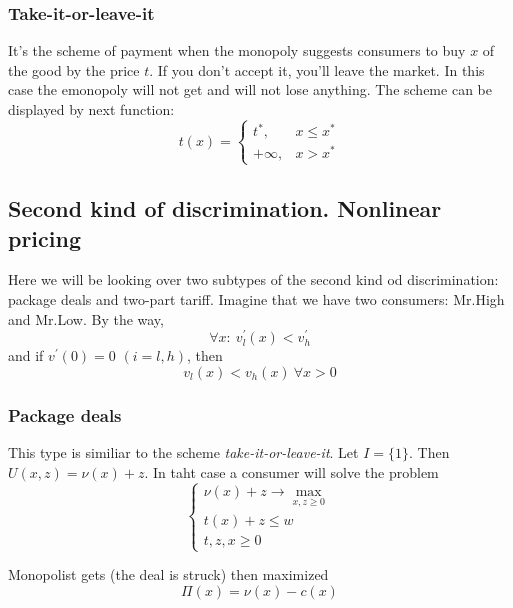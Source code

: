 \documentclass[a4paper, 10pt]{article}
\begin{document}
\subsubsection{Take-it-or-leave-it}
It's the scheme of payment when the monopoly suggests consumers to buy $x$ of the good by the price $t$. If you don't accept it, you'll leave the market. In this case the emonopoly will not get and will not lose anything. The scheme can be displayed by next function:
\begin{equation*}
    t(x)=\begin{cases}
        t^*,&x\leqslant x^*\\
        +\infty, & x>x^*
    \end{cases}
\end{equation*}


\subsection{Second kind of discrimination. Nonlinear pricing}
Here we will be looking over two subtypes of the second kind od discrimination: package deals and two-part tariff. Imagine that we have two consumers: Mr.High and Mr.Low. By the way, 
\begin{equation*}
    \forall x:\ v^\prime_l(x) < v^\prime_h
\end{equation*}
and if $v^\prime(0)=0$ $(i=l,h)$, then
\begin{equation*}
    v_l(x) < v_h(x)\ \forall x>0
\end{equation*}

\subsubsection{Package deals}
This type is similiar to the scheme \textit{take-it-or-leave-it}. Let $I=\{1\}$. Then $U(x,z)=\nu(x)+z$. In taht case a consumer will solve the problem
\begin{equation*}
    \begin{cases}
        \nu(x)+z\longrightarrow\max\limits_{x,z\geqslant0}\\
        t(x)+z\leqslant w\\
        t,z,x\geqslant 0
    \end{cases}
\end{equation*}

Monopolist gets (the deal is struck) then maximized
\begin{equation*}
    \Pi(x)=\nu(x)-c(x)
\end{equation*}
\end{document}

